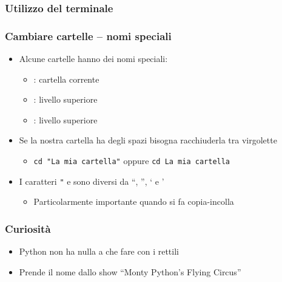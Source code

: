 \begin{exampleframe}
    \frametitle{Utilizzo del terminale}
    \frametitle{Cambiare cartelle -- nomi speciali}

    
    \begin{itemize}
        \item Alcune cartelle hanno dei nomi speciali:
        \begin{itemize}
            \item {}: cartella corrente
            \item {}: livello superiore
            \item \boxed{\texttt{\tilde}}: livello superiore
        \end{itemize}
        \bigskip
        
        \item Se la nostra cartella ha degli spazi bisogna racchiuderla tra virgolette
        \begin{itemize}
            \item \texttt{cd "La mia cartella"} oppure \texttt{cd \textquotesingle{}La mia cartella\textquotesingle{}} 
        \end{itemize}
        
        \bigskip
        \item I caratteri \texttt{"} e \texttt{\textquotesingle{}} sono diversi da ``, '', ` e '
        \begin{itemize}
            \item Particolarmente importante quando si fa copia-incolla
        \end{itemize}
    \end{itemize}
\end{exampleframe}


\begin{exampleframe}
    \frametitle{Curiosità}

    \begin{itemize}
        \item Python non ha nulla a che fare con i rettili
        \item Prende il nome dallo show ``Monty Python's Flying Circus''
    \end{itemize}

    \bigskip
    \begin{columns}
        \centering
        
        \centering
    \end{columns}
\end{exampleframe}

